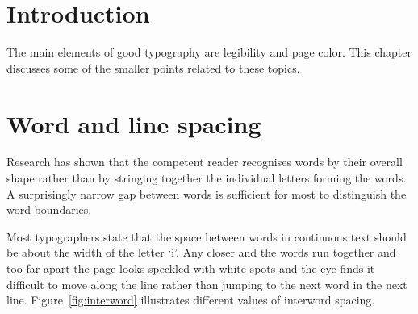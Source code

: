 \documentclass[10pt,letterpaper]{memoir}
\begin{document}
\section{Introduction}

    The main elements of good typography are legibility and page color.
This chapter discusses some of the smaller points related to these topics.

\section{Word and line spacing}

    Research has shown that the competent reader recognises words by
their overall shape rather than by stringing together the individual letters
forming the words. A surprisingly narrow gap between words
is sufficient for most to distinguish the word boundaries.

    Most typographers state that the space between words in continuous
text should be about the width of the letter `i'. Any closer and the
words run together and too far apart the page looks speckled with white
spots and the eye finds it difficult to move along the line rather than
jumping to the next word in the next line. 
    Figure~\ref{fig:interword} illustrates different values of interword
spacing.
\end{document}
